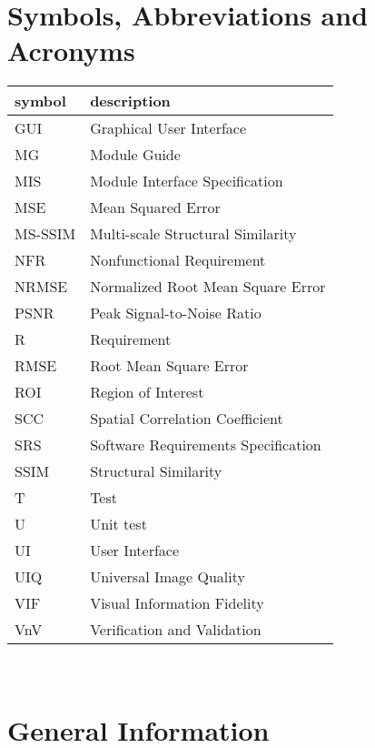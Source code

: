 \documentclass[12pt, titlepage]{article}
\begin{document}
\newpage

\tableofcontents

\listoftables

\newpage

\section{Symbols, Abbreviations and Acronyms}

\renewcommand{\arraystretch}{1.2}
\begin{tabular}{l l} 
  \toprule		
  \textbf{symbol} & \textbf{description}\\
  \midrule 
  GUI & Graphical User Interface\\
  MG & Module Guide \\
  MIS & Module Interface Specification \\
  MSE & Mean Squared Error\\
  MS-SSIM & Multi-scale Structural Similarity\\
  NFR & Nonfunctional Requirement\\
  NRMSE & Normalized Root Mean Square Error\\
  PSNR & Peak Signal-to-Noise Ratio\\
  R & Requirement\\
  RMSE & Root Mean Square Error\\
  ROI & Region of Interest\\
  SCC & Spatial Correlation Coefficient\\
  SRS & Software Requirements Specification\\
  SSIM & Structural Similarity\\
  T & Test\\
  U & Unit test\\
  UI & User Interface\\
  UIQ & Universal Image Quality\\
  VIF & Visual Information Fidelity \\
  VnV & Verification and Validation\\
  \bottomrule
\end{tabular}\\

\newpage


\section{General Information}
\end{document}
